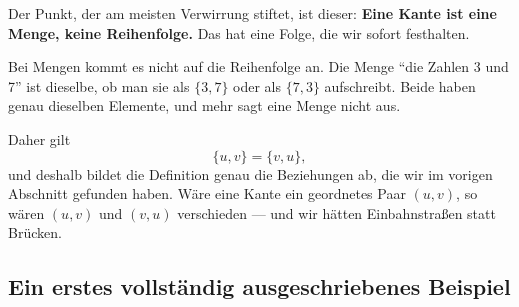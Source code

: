 Der Punkt, der am meisten Verwirrung stiftet, ist dieser: \textbf{Eine Kante ist eine Menge, keine Reihenfolge.} Das hat eine Folge, die wir sofort festhalten.

\begin{merksatz}
Bei Mengen kommt es nicht auf die Reihenfolge an. Die Menge \enquote{die Zahlen 3 und 7} ist dieselbe, ob man sie als $\{3,7\}$ oder als $\{7,3\}$ aufschreibt. Beide haben genau dieselben Elemente, und mehr sagt eine Menge nicht aus.

Daher gilt
\[ \{u,v\} = \{v,u\}, \]
und deshalb bildet die Definition genau die  Beziehungen ab, die wir im vorigen Abschnitt gefunden haben. Wäre eine Kante ein geordnetes Paar $(u,v)$, so wären $(u,v)$ und $(v,u)$ verschieden --- und wir hätten Einbahnstraßen statt Brücken.

\begin{center}
\begin{minipage}{0.86\textwidth}
\end{minipage}
\end{center}
\end{merksatz}

\subsection*{Ein erstes vollständig ausgeschriebenes Beispiel}

